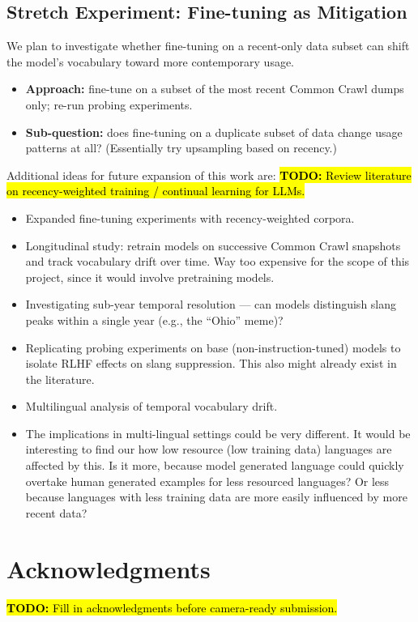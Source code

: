 \documentclass[11pt]{article}
\newcommand{\todo}[1]{\hl{\textbf{TODO:} #1}}
\begin{document}
\subsection{Stretch Experiment: Fine-tuning as Mitigation}

We plan to investigate whether fine-tuning on a recent-only data subset can shift the model's vocabulary toward more contemporary usage.

\begin{itemize}
  \item \textbf{Approach:} fine-tune on a subset of the most recent
  Common Crawl dumps only; re-run probing experiments.
  \item \textbf{Sub-question:} does fine-tuning on a duplicate subset of data change usage patterns at all? (Essentially try upsampling based on recency.)
\end{itemize}

Additional ideas for future expansion of this work are:
\todo{ Review literature on recency-weighted training / continual
learning for LLMs.}
\begin{itemize}
  \item Expanded fine-tuning experiments with recency-weighted corpora.
  \item Longitudinal study: retrain models on successive Common Crawl
  snapshots and track vocabulary drift over time. Way too expensive for the scope of this project, since it would involve pretraining models.
  \item Investigating sub-year temporal resolution --- can models distinguish slang peaks within a single year (e.g., the ``Ohio'' meme)?
  \item Replicating probing experiments on base (non-instruction-tuned) models to isolate RLHF effects on slang suppression. This also might already exist in the literature.
\item Multilingual analysis of temporal vocabulary drift.
  \item The implications in multi-lingual settings could be very different. It would be interesting to find our how low resource (low training data) languages are affected by this. Is it more, because model generated language could quickly overtake human generated examples for less resourced languages? Or less because languages with less training data are more easily influenced by more recent data?
\end{itemize}

\section*{Acknowledgments}
\todo{Fill in acknowledgments before camera-ready submission.}
\end{document}
